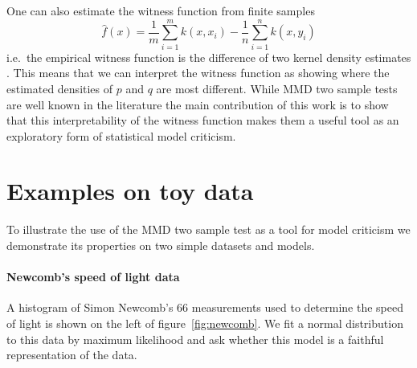 \documentclass{article} %
\def\ie{i.e.\ }
\begin{document}
\vspace{-0.6\baselineskip}

One can also estimate the witness function from finite samples
\vspace{-0.2\baselineskip}
\begin{equation}
\hat{f}(x) = \frac{1}{m}\sum_{i=1}^{m}k(x,x_i) - \frac{1}{n}\sum_{i=1}^{n}k(x,y_i)
\label{eq:witness-estimate}
\end{equation}
\ie the empirical witness function is the difference of two kernel density estimates \citep[e.g.][]{Rosenblatt1956-hx, Parzen1962-hk}.
This means that we can interpret the witness function as showing where the estimated densities of $p$ and $q$ are most different.
While MMD two sample tests are well known in the literature the main contribution of this work is to show that this interpretability of the witness function makes them a useful tool as an exploratory form of statistical model criticism.

\section{Examples on toy data}

To illustrate the use of the MMD two sample test as a tool for model criticism we demonstrate its properties on two simple datasets and models.

\paragraph{Newcomb's speed of light data}

A histogram of Simon Newcomb's 66 measurements used to determine the speed of light \citep{Stigler1977-dd} is shown on the left of figure~\ref{fig:newcomb}.
We fit a normal distribution to this data by maximum likelihood and ask whether this model is a faithful representation of the data.
\end{document}
